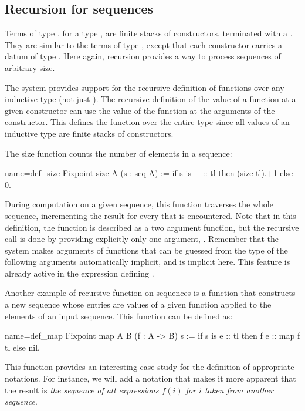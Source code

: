 \subsection{Recursion for sequences}

Terms of type , for a type , are finite stacks of
 constructors, terminated with a . They are similar to
the terms of type , except that each  constructor
carries a datum of type . Here again, recursion provides a way
to process sequences of arbitrary size.


The \Coq{} system provides support for the recursive definition of
functions over any inductive type (not just ). The recursive
definition of the value of a
function at a given constructor can use the value of the function at
the arguments of the constructor. This defines the function over the
entire type since all values of an inductive type are finite stacks of
constructors.

The size function counts the number of elements in a sequence:

\begin{coq}{name=def_size}{}
Fixpoint size A (s : seq A) :=
  if s is _ :: tl then (size tl).+1 else 0.
\end{coq}
During computation on a given sequence, this function traverses
the whole sequence, incrementing the result for every
 that is encountered.  Note that in this
definition, the function  is described as a two argument
function, but the recursive call  is done by providing
explicitly only one argument, . Remember that
the \Coq{} system makes
arguments of functions that can be guessed from the type of the following
arguments automatically implicit, and  is implicit here. This
feature is already active in the expression defining .

Another example of recursive function on sequences is a function that constructs
a new sequence whose entries are values of a given function applied to
the elements of an input sequence.  This function can be defined as:

\begin{coq}{name=def_map}{}
Fixpoint map A B (f : A -> B) s :=
  if s is e :: tl then f e :: map f tl else nil.
\end{coq}
This function provides an interesting case study for the definition of
appropriate notations. For instance, we will add a notation that
makes it more apparent that the result is {\em the sequence of all
expressions \(f(i)\) for \(i\) taken from another sequence}.

